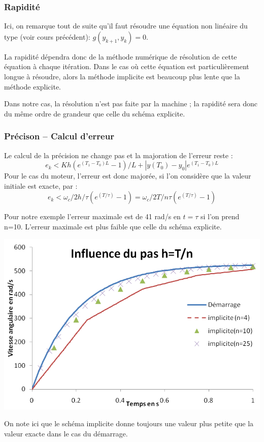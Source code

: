 \documentclass[10pt]{article}
\begin{document}
\subsubsection{Rapidité}

Ici, on remarque tout de suite qu’il faut résoudre une équation non linéaire du type (voir cours précédent):
$g(y_{k+1},y_k)=0$.

La rapidité dépendra donc de la méthode numérique de résolution de cette équation à chaque itération. Dans le cas où cette équation est particulièrement longue à résoudre, alors la méthode implicite est beaucoup plus lente que la méthode explicite.

Dans notre cas, la résolution n’est pas faite par la machine ; la rapidité sera donc du même ordre de grandeur que celle du schéma explicite.


\subsubsection{Précison -- Calcul d'erreur}

Le calcul de la précision ne change pas et la majoration de l’erreur reste :
$$e_k<Kh (e^{(T_1-T_0 )L}-1)/L+|y(T_0 )-y_0 | e^{(T_1-T_0 )L}$$
Pour le cas du moteur, l’erreur est donc majorée, si l’on considère que la valeur initiale est exacte, par :
$$e_k<\omega_c/2  h/\tau (e^(T/\tau)-1)=\omega_c/2  T/n\tau (e^(T/\tau)-1)$$

Pour notre exemple l’erreur maximale est de 41 rad/s en $t=\tau$ si l’on prend n=10. L’erreur maximale est plus faible que celle du schéma explicite.


\begin{center}
\includegraphics[width=.8\textwidth]{images/fig_11}
\end{center}

On note ici que le schéma implicite donne toujours une valeur plus petite que la valeur exacte dans le cas du démarrage.
\end{document}
